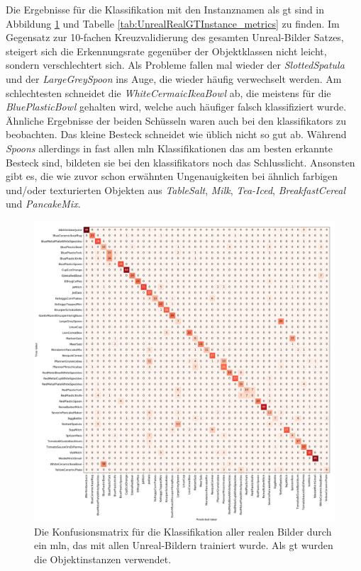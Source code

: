 Die Ergebnisse für die Klassifikation mit den Instanznamen als \gls{gt} sind in Abbildung \ref{fig:UnrealRealGTInstance_confMatrix} und Tabelle \ref{tab:UnrealRealGTInstance_metrics} zu finden. Im Gegensatz zur 10-fachen Kreuzvalidierung des gesamten Unreal-Bilder Satzes, steigert sich die Erkennungsrate gegenüber der Objektklassen nicht leicht, sondern verschlechtert sich. Als Probleme fallen mal wieder der \textit{SlottedSpatula} und der \textit{LargeGreySpoon} ins Auge, die wieder häufig verwechselt werden. Am schlechtesten schneidet die \textit{WhiteCermaicIkeaBowl} ab, die meistens für die \textit{BluePlasticBowl} gehalten wird, welche auch häufiger falsch klassifiziert wurde. Ähnliche Ergebnisse der beiden Schüsseln waren auch bei den \glspl{klassifikator} zu beobachten. Das kleine Besteck schneidet wie üblich nicht so gut ab. Während \textit{Spoons} allerdings in fast allen \gls{mln} Klassifikationen das am besten erkannte Besteck sind, bildeten sie bei den \glspl{klassifikator} noch das Schlusslicht. Ansonsten gibt es, die wie zuvor schon erwähnten Ungenauigkeiten bei ähnlich farbigen und/oder texturierten Objekten aus \textit{TableSalt}, \textit{Milk}, \textit{Tea-Iced}, \textit{BreakfastCereal} und \textit{PancakeMix}.

\begin{figure}
\centering
	\includegraphics[scale=.3]{img/chapter6/UnrealRealGTInstance.png}
\caption[Konfusionsmatrix der Objektinstanzen Klassifikation mit Unreal-Trainingsset und realem Testset]{Die Konfusionsmatrix für die Klassifikation aller realen Bilder durch ein \gls{mln}, das mit allen Unreal-Bildern trainiert wurde. Als \gls{gt} wurden die Objektinstanzen verwendet.}
\label{fig:UnrealRealGTInstance_confMatrix}
\end{figure}  

